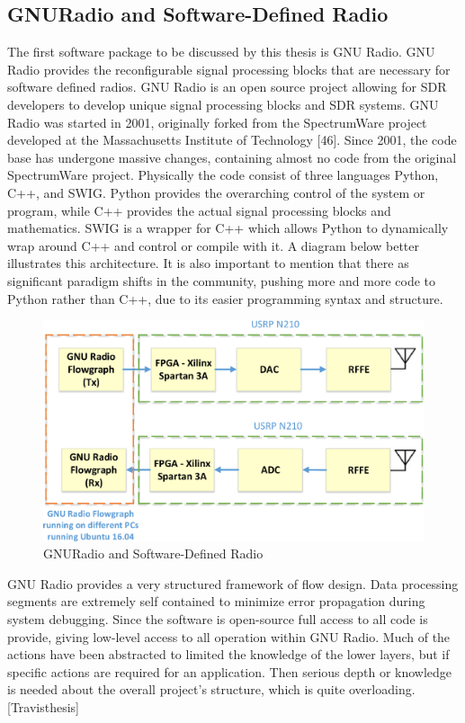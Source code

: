 \subsection{GNURadio and Software-Defined Radio}
The first software package to be discussed by this thesis is GNU Radio. GNU Radio provides the reconfigurable signal processing blocks that are necessary for software defined
radios. GNU Radio is an open source project allowing for SDR developers to develop unique signal processing blocks and SDR systems. GNU Radio was started in 2001, originally
forked from the SpectrumWare project developed at the Massachusetts Institute of Technology [46]. Since 2001, the code base has undergone massive changes, containing almost
no code from the original SpectrumWare project. Physically the code consist of three languages Python, C++, and SWIG. Python provides the overarching control of the system or
program, while C++ provides the actual signal processing blocks and mathematics. SWIG is a wrapper for C++ which allows Python to dynamically wrap around C++ and control
or compile with it. A diagram below better illustrates this architecture. It is also important to mention that there as significant paradigm shifts in the community, pushing more and more code to Python rather than C++, due to its easier programming syntax and structure.

\begin{figure}[ht!]
	\centering
	\includegraphics[width=\textwidth,keepaspectratio]{images/Gill/figs/gnuradio.eps}
    \caption{GNURadio and Software-Defined Radio} 
\label{usrp}      
\end{figure}

GNU Radio provides a very structured framework of flow design. Data processing segments are extremely self contained to minimize error propagation during system debugging.
Since the software is open-source full access to all code is provide, giving low-level access to all operation within GNU Radio. Much of the actions have been abstracted to limited the
knowledge of the lower layers, but if specific actions are required for an application. Then serious depth or knowledge is needed about the overall project’s structure, which is quite
overloading.[Travisthesis]



